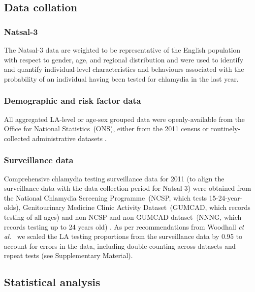 \documentclass[fleqn,10pt]{wlscirep}
\begin{document}
\subsection*{Data collation}

\subsubsection*{Natsal-3}
The Natsal-3 data are weighted to be representative of the English population with respect to gender, age, and regional distribution \cite{Mercer2013,Erens2014b} and were used to identify and quantify individual-level characteristics and behaviours associated with the probability of an individual having been tested for chlamydia in the last year.

\subsubsection*{Demographic and risk factor data}
All aggregated LA-level or age-sex grouped data were openly-available from the Office for National Statistics~(ONS), either from the 2011 census \cite{ONS_cesnsusdata} or routinely-collected administrative datasets \cite{OfficeforNationalStatistics2011, OfficeforNationalStatistics2011a, DepartmentforCommunitiesandLocalGovernment, ONS_conceptions, ONS_urbanrural}.

\subsubsection*{Surveillance data}
Comprehensive chlamydia testing surveillance data for 2011 (to align the surveillance data with the data collection period for Natsal-3) were obtained from the National Chlamydia Screening Programme~(NCSP, which tests 15-24-year-olds), Genitourinary Medicine Clinic Activity Dataset~(GUMCAD, which records testing of all ages) and non-NCSP and non-GUMCAD dataset~(NNNG, which records testing up to 24 years old) \cite{PublicHealthEngland}. As per recommendations from Woodhall {\it et al.}~\cite{Woodhall2013} we scaled the LA testing proportions from the surveillance data by 0.95 to account for errors in the data, including double-counting across datasets and repeat tests (see Supplementary Material).

\subsection*{Statistical analysis}
\end{document}
